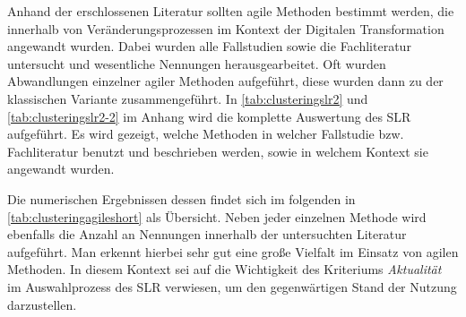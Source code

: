 
Anhand der erschlossenen Literatur sollten agile Methoden bestimmt werden, die innerhalb von Veränderungsprozessen im Kontext der Digitalen Transformation angewandt wurden. Dabei wurden alle Fallstudien sowie die Fachliteratur untersucht und wesentliche Nennungen herausgearbeitet. Oft wurden Abwandlungen einzelner agiler Methoden aufgeführt, diese wurden dann zu der klassischen Variante zusammengeführt. In  \ref{tab:clusteringslr2} und \ref{tab:clusteringslr2-2} im Anhang wird die komplette Auswertung des SLR aufgeführt. Es wird gezeigt, welche Methoden in welcher Fallstudie bzw. Fachliteratur benutzt und beschrieben werden, sowie in welchem Kontext sie angewandt wurden. 


Die numerischen Ergebnissen dessen findet sich im folgenden in \ref{tab:clusteringagileshort} als Übersicht. Neben jeder einzelnen Methode wird ebenfalls die Anzahl an Nennungen innerhalb der untersuchten Literatur aufgeführt. Man erkennt hierbei sehr gut eine große Vielfalt im Einsatz von agilen Methoden. In diesem Kontext sei auf die Wichtigkeit des Kriteriums \textit{Aktualität} im Auswahlprozess des SLR verwiesen, um den gegenwärtigen Stand der Nutzung darzustellen.

